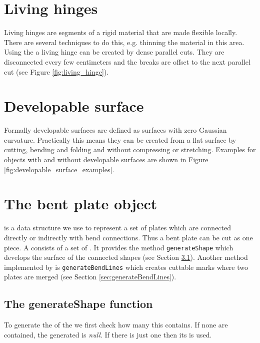 \documentclass[../ClassicThesis.tex]{subfiles}
\begin{document}
\section{Living hinges}
\label{sec:living_hinges}

Living hinges are segments of a rigid material that are made flexible locally. There are several techniques to do this, e.g. thinning the material in this area. Using the \lasercutter{} a living hinge can be created by dense parallel cuts. They are disconnected every few centimeters and the breaks are offset to the next parallel cut (see Figure \ref{fig:living_hinge}).


\section{Developable surface}

Formally developable surfaces are defined as surfaces with zero Gaussian curvature. Practically this means they can be created from a flat surface by cutting, bending and folding and without compressing or stretching. Examples for objects with and without developable surfaces are shown in Figure \ref{fig:developable_surface_examples}.


\section{The bent plate object}

 is a data structure we use to represent a set of plates which are connected directly or indirectly with bend connections. Thus a bent plate can be cut as one piece. A  consists of a set of . It provides the method \texttt{generateShape} which develops the surface of the connected shapes (see Section \ref{sec:generateShape}). Another method implemented by  is \texttt{generateBendLines} which creates cuttable marks where two plates are merged (see Section \ref{sec:generateBendLines}).

\subsection{The generateShape function}
\label{sec:generateShape}

To generate the  of the  we first check how many  this  contains. If none are contained, the generated  is \emph{null}. If there is just one  then its  is used.
\end{document}
